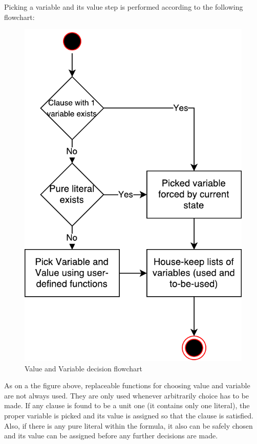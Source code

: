 \documentclass[12pt,english,pdflatex]{aghdpl}
\begin{document}
Picking a variable and its value step is performed according to the following flowchart:

\begin{figure}[H]
\begin{centering}
\includegraphics[scale=0.7]{img/pick_var_and_val}
\par\end{centering}
\caption{Value and Variable decision flowchart}
\end{figure}

As on a the figure above, replaceable functions for choosing value and variable
are not always used. They are only used whenever arbitrarily choice
has to be made. If any clause is found to be a unit one (it contains only one literal), 
the proper variable is
picked and its value is assigned so that the clause is satisfied. Also, if there is any pure
literal within the formula, it also can be safely chosen and its value can be assigned before any further 
decisions are made.
\end{document}
